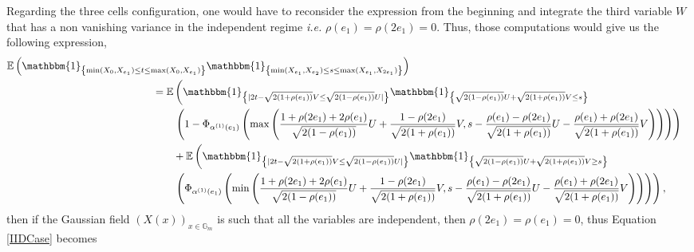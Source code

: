 \documentclass[12pt]{article}
\theoremstyle{Theorem}
\theoremstyle{definition}
\begin{document}
Regarding the three cells configuration, one would have to reconsider the expression from the beginning and integrate the third variable $W$ that has a non vanishing variance in the independent regime \textit{i.e.} $\rho(e_1) = \rho(2e_1)=0$. Thus, those computations would give us the following expression,
{\tiny
\begin{align}
\label{IIDCase}
\mathbb{E}\left(\mathbbm{1}_{\left\{\min(X_{\scriptscriptstyle 0}, X_{e_1}) \leq t \leq \max(X_{\scriptscriptstyle 0}, X_{e_1})\right\}}\mathbbm{1}_{\left\{\min(X_{e_1}, X_{e_2}) \leq s \leq \max(X_{e_1}, X_{2e_1}) \right\}}\right) \nonumber \\
& \hspace{-8.7cm} = \mathbb{E}\left(\mathbbm{1}_{\left\{|2t - \sqrt{2(1+\rho(e_1))}V \leq \sqrt{2(1-\rho(e_1))}U|\right\}}\mathbbm{1}_{\left\{\sqrt{2(1-\rho(e_1))}U + \sqrt{2(1+\rho(e_1))}V \leq s\right\}}\right. \nonumber \\
& \hspace{-8cm} \left. \left(1 - \Phi_{\alpha^{(1)}(e_1)}\left(\max\left(\frac{1 + \rho(2e_1) + 2\rho(e_1)}{\sqrt{2(1-\rho(e_1))}}U + \frac{1-\rho(2e_1)}{\sqrt{2(1+\rho(e_1))}}V, s - \frac{\rho(e_1) - \rho(2e_1)}{\sqrt{2(1+\rho(e_1))}} U - \frac{\rho(e_1) + \rho(2e_1)}{\sqrt{2(1+\rho(e_1))}}V \right) \right)\right)\right) \nonumber\\
& \hspace{-8cm} + \mathbb{E}\left(\mathbbm{1}_{\left\{|2t - \sqrt{2(1+\rho(e_1))}V \leq \sqrt{2(1-\rho(e_1))}U|\right\}}\mathbbm{1}_{\left\{\sqrt{2(1-\rho(e_1))}U+ \sqrt{2(1+\rho(e_1))}V \geq s\right\}}\right. \nonumber\\
& \hspace{-8cm} \left. \left(\Phi_{\alpha^{(1)}(e_1)}\left(\min\left(\frac{1 + \rho(2e_1) + 2\rho(e_1)}{\sqrt{2(1-\rho(e_1))}}U + \frac{1-\rho(2e_1)}{\sqrt{2(1+\rho(e_1))}}V, s - \frac{\rho(e_1) - \rho(2e_1)}{\sqrt{2(1+\rho(e_1))}} U - \frac{\rho(e_1) + \rho(2e_1)}{\sqrt{2(1+\rho(e_1))}}V \right) \right)\right)\right),
\end{align}}then if the Gaussian field $\left(X(x)\right)_{x \in \mathbb{G}_{m}}$ is such that all the variables are independent, then $\rho(2e_1) = \rho(e_1) = 0$, thus Equation \eqref{IIDCase} becomes 
\end{document}
